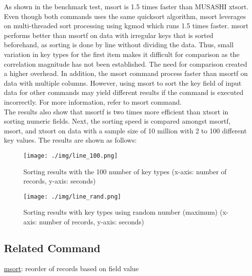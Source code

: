 \documentclass[a4paper]{jarticle}
\begin{document}
\newpage
As shown in the benchmark test, msort is 1.5 times faster than MUSASHI xtsort. Even though both commands uses the same quicksort algorithm, msort leverages on multi-threaded sort processing using kgmod which runs 1.5 times faster. 
msort performs better than msortf on data with irregular keys that is sorted beforehand, as sorting is done by line without dividing the data. Thus, small variation in key types for the first item makes it difficult for comparison as the correlation magnitude has not been established.  The need for comparison created a higher overhead. 
In addition, the msort command process faster than msortf on data with multiple columns.  However, using msort to sort the key field of input data for other commands may yield different results if the command is executed incorrectly. For more information, refer to msort command. \\

The results also show that msortf is two times more efficient than xtsort in sorting numeric fields.
Next, the sorting speed is compared amongst msortf, msort, and xtsort on data with a sample size of 10 million with 2 to 100 different key values. The results are shown as follows: \\

\begin{figure}[!h]
\begin{center}
\texttt{[image: ./img/line\_100.png]}
\end{center}
\caption{Sorting results with the 100 number of key types (x-axis: number of records, y-axis: seconds)}
\end{figure}

\begin{figure}[!h]
\begin{center}
\texttt{[image: ./img/line\_rand.png]}
\end{center}
\caption{Sorting results with key types using random number (maximum) (x-axis: number of records, y-axis: seconds)}
\end{figure}

\subsection*{Related Command}
\noindent
\href{run:msort.pdf}{msort}: reorder of records based on field value\\
\end{document}
